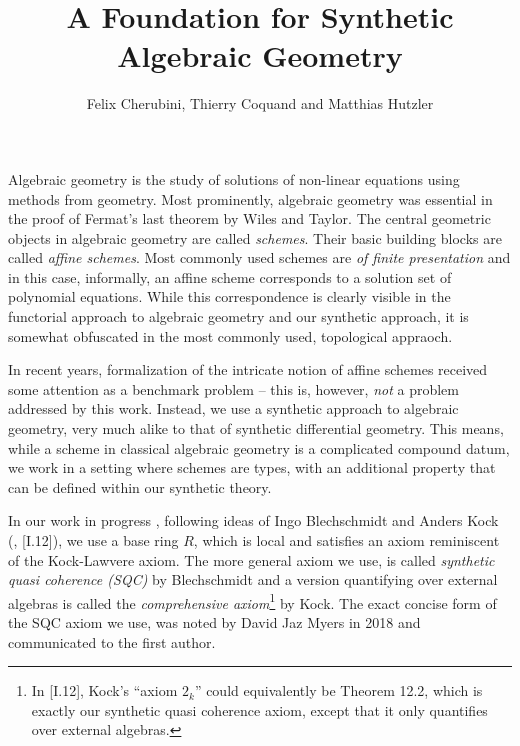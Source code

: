 \documentclass{../util/zariski}
\title{A Foundation for Synthetic Algebraic Geometry}
\author{Felix Cherubini, Thierry Coquand and Matthias Hutzler}
\begin{document}
\maketitle

Algebraic geometry is the study of solutions of non-linear equations using methods from geometry.
Most prominently, algebraic geometry was essential in the proof of Fermat's last theorem by Wiles and Taylor.
The central geometric objects in algebraic geometry are called \emph{schemes}.
Their basic building blocks are called \emph{affine schemes}.
Most commonly used schemes are \emph{of finite presentation} and in this case,
informally, an affine scheme corresponds to a solution set of polynomial equations.
While this correspondence is clearly visible in the functorial approach to algebraic geometry and our synthetic approach,
it is somewhat obfuscated in the most commonly used, topological appraoch.

In recent years,
formalization of the intricate notion of affine schemes
received some attention as a benchmark problem
-- this is, however, \emph{not} a problem addressed by this work.
Instead, we use a synthetic approach to algebraic geometry,
very much alike to that of synthetic differential geometry.
This means, while a scheme in classical algebraic geometry is a complicated compound datum,
we work in a setting where schemes are types,
with an additional property that can be defined within our synthetic theory.

In our work in progress \cite{draft},
following ideas of Ingo Blechschmidt and Anders Kock  (\cite{ingo-thesis}, \cite{kock-sdg}[I.12]),
we use a base ring $R$, which is local and satisfies an axiom reminiscent of the Kock-Lawvere axiom.
The more general axiom we use, is called \emph{synthetic quasi coherence (SQC)} by Blechschmidt and
a version quantifying over external algebras is called the \emph{comprehensive axiom}\footnote{
  In \cite{kock-sdg}[I.12], Kock's ``axiom $2_k$'' could equivalently be Theorem 12.2,
  which is exactly our synthetic quasi coherence axiom, except that it only quantifies over external algebras.
}
by Kock.
The exact concise form of the SQC axiom we use, was noted by David Jaz Myers in 2018 and communicated to the first author.
\end{document}
